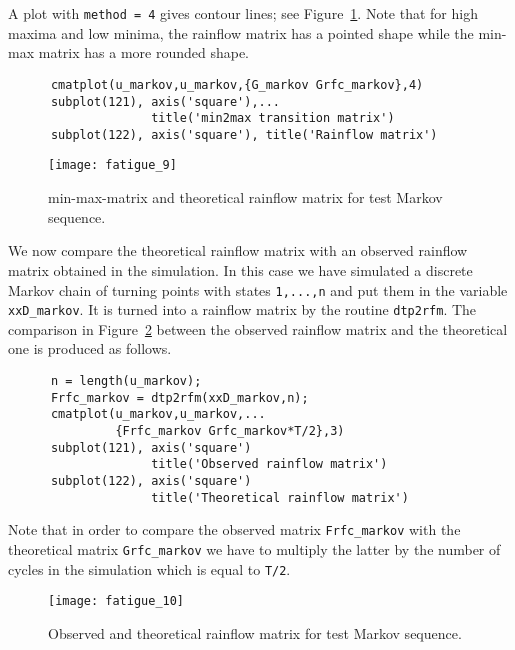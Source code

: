 A plot with \verb+method = 4+ gives contour lines;
see Figure~\ref{fig_wafo_6.1}.
Note that for high maxima and low minima, the rainflow matrix has
a pointed shape while the min-max matrix has a more rounded shape.
{\small\begin{verbatim}
      cmatplot(u_markov,u_markov,{G_markov Grfc_markov},4)
      subplot(121), axis('square'),...
                    title('min2max transition matrix')
      subplot(122), axis('square'), title('Rainflow matrix')
\end{verbatim}}

\begin{figure}
\centering
\texttt{[image: fatigue\_9]}
\vspace{-3mm}
\caption[Theoretical min-max  and
rainflow matrix for test Markov sequence]
{min-max-matrix and theoretical
rainflow matrix for test Markov sequence.}
\label{fig_wafo_6.1}
\end{figure}

We now compare the theoretical rainflow matrix with an observed rainflow
matrix obtained in the simulation. In this case we have simulated a
discrete Markov chain of turning points with states {\tt 1,...,n} and put
them in the variable \verb+xxD_markov+. It is turned into a rainflow
matrix by the  routine \verb|dtp2rfm|. 
The comparison in  
Figure~\ref{fig_wafo_6.3} between the observed
rainflow matrix and the theoretical one is produced as follows.
{\small\begin{verbatim}
      n = length(u_markov);
      Frfc_markov = dtp2rfm(xxD_markov,n);
      cmatplot(u_markov,u_markov,...
               {Frfc_markov Grfc_markov*T/2},3)
      subplot(121), axis('square')
                    title('Observed rainflow matrix')
      subplot(122), axis('square')
                    title('Theoretical rainflow matrix')
\end{verbatim}}

Note that in order to compare the observed matrix \verb+Frfc_markov+ 
with the theoretical matrix \verb+Grfc_markov+ we have 
to multiply the latter by the
number of cycles in the simulation which is equal to {\tt T/2}.

\begin{figure}[tbh]
\centering
\texttt{[image: fatigue\_10]}
\vspace{-3mm}
\caption[Observed and theoretical rainflow matrix for test Markov sequence]
{Observed and theoretical rainflow matrix for test Markov sequence.}
\label{fig_wafo_6.3}
\end{figure}

